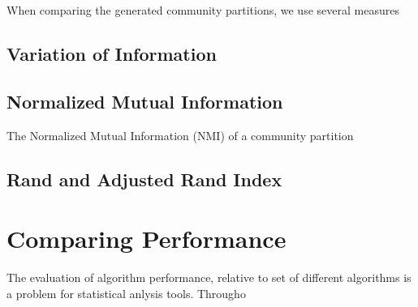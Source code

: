 When comparing the generated community partitions, we use several measures

\subsection{Variation of Information}
\cite{Marina2007}

\subsection{Normalized Mutual Information}
The Normalized Mutual Information (NMI) of a community partition 

\subsection{Rand and Adjusted Rand Index}
\cite{rand1971}


\section{Comparing Performance}

The evaluation of algorithm performance, relative to set of different algorithms is a problem for statistical anlysis tools. Througho